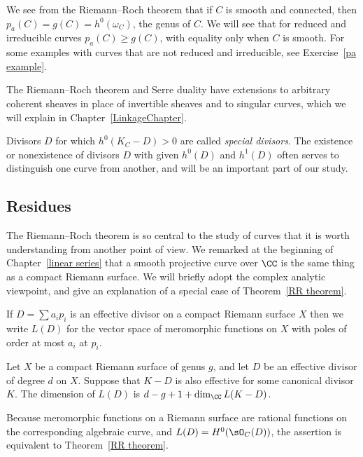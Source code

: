 We see from the Riemann--Roch theorem that if $C$ is smooth and connected, then $p_a(C) = g(C) = h^0(\omega_C)$, the genus of $C$. We
will see that for reduced and irreducible curves $p_a(C) \geq g(C)$, with equality only when $C$ is smooth.
  For some examples with curves that are not
reduced and irreducible, see Exercise~\ref{pa example}.
  

The Riemann--Roch theorem and Serre duality have extensions to arbitrary coherent sheaves in place of invertible sheaves 
and to singular curves, which we will explain in Chapter~\ref{LinkageChapter}.

Divisors $D$ for which $h^0(K_C - D)>0$ are called \emph{special divisors}. The existence or nonexistence of divisors $D$ with given $h^{0}(D)$ and $h^{1}(D)$ often serves to distinguish one curve from another, and will be an important part of our study.

\subsection*{Residues} 

The 
Rie\-mann--Roch theorem is so central to the study of curves that it is worth understanding from another point
of view.
We remarked at the beginning of Chapter~\ref{linear series} that a
smooth projective curve over $\CC$ is the same thing as a compact
Riemann surface. 
We will briefly adopt
the complex analytic viewpoint, and give an explanation of 
%
a special case of Theorem~\ref{RR theorem}.

If $D = \sum a_ip_i$ is an effective divisor 
on a compact Riemann surface $X$ then we write $L(D)$ 
for the vector space of meromorphic functions on $X$ with poles of order 
at most $a_i$ at $p_i$. 

\begin{theorem}
Let $X$ be a compact Riemann surface of genus $g$, and let $D$ be an effective divisor of degree $d$ on $X$. Suppose that $K-D$ is also effective for some canonical divisor $K$.
The dimension of  $L(D)$ is
$d-g+1+\dim_\CC L(K-D)$.
\unif
\end{theorem}

Because  meromorphic functions on a Riemann surface are rational functions on the corresponding
algebraic curve, and $L(D) = H^0(\sO_C(D))$, the assertion is equivalent to Theorem~\ref{RR theorem}.

